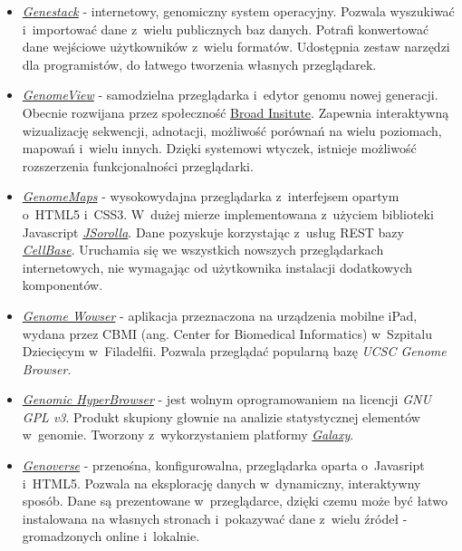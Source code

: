 \begin{itemize}
	\item \href{https://genestack.com/}{\emph{Genestack}} \label{genestack} - internetowy, genomiczny system operacyjny. Pozwala wyszukiwać i~importować dane z~wielu publicznych baz danych. Potrafi konwertować dane wejściowe użytkowników z~wielu formatów. Udostępnia zestaw narzędzi dla programistów, do łatwego tworzenia własnych przeglądarek.
	
	\item \href{http://genomeview.org/}{\emph{GenomeView}} \label{genomeview} - samodzielna przeglądarka i~edytor genomu nowej generacji. Obecnie rozwijana przez społeczność \href{http://www.broadinstitute.org/}{Broad Insitute}. Zapewnia interaktywną wizualizację sekwencji, adnotacji, możliwość porównań na wielu poziomach, mapowań i~wielu innych. Dzięki systemowi wtyczek, istnieje możliwość rozszerzenia funkcjonalności przeglądarki.
	
	\item \href{http://www.genomemaps.org/}{\emph{GenomeMaps}} \label{genomemaps} - wysokowydajna przeglądarka z~interfejsem opartym o~HTML5 i~CSS3. W~dużej mierze implementowana z~użyciem biblioteki Javascript \href{https://github.com/opencb/jsorolla}{\mbox{\emph{JSorolla}}}. Dane pozyskuje korzystając z~usług REST bazy \href{https://github.com/opencb/cellbase/wiki}{\emph{CellBase}}. Uruchamia się we wszystkich nowszych przeglądarkach internetowych, nie wymagając od użytkownika instalacji dodatkowych komponentów.
	
	\item \href{http://www.popsci.com/science/article/2011-06/introducing-genome-wowser-ipad-app-lets-you-browse-human-genome}{\emph{Genome Wowser}} - aplikacja przeznaczona na urządzenia mobilne iPad, wydana przez CBMI (ang. Center for Biomedical Informatics) w~Szpitalu Dziecięcym w~Filadelfii. Pozwala przeglądać popularną bazę \emph{UCSC Genome Browser}.
	
	\item \href{https://hyperbrowser.uio.no/hb/}{\emph{Genomic HyperBrowser}} - jest wolnym oprogramowaniem na licencji \emph{GNU GPL v3}. Produkt skupiony głownie na analizie statystycznej elementów w~genomie. Tworzony z~wykorzystaniem platformy \href{https://en.wikipedia.org/wiki/Galaxy_(computational_biology)}{\emph{Galaxy}}.
	
	\item \href{http://wtsi-web.github.io/Genoverse/}{\emph{Genoverse}} - przenośna, konfigurowalna, przeglądarka oparta o~Javasript i~HTML5. Pozwala na eksplorację danych w~dynamiczny, interaktywny sposób. Dane są prezentowane w~przeglądarce, dzięki czemu może być łatwo instalowana na własnych stronach i~pokazywać dane z~wielu źródeł - gromadzonych online i~lokalnie.
	

\end{itemize}
